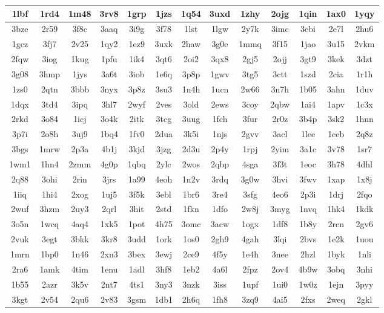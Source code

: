 \begin{tabular}{|c|c|c|c|c|c|c|c|c|c|c|c|c|}
\hline
1lbf & 1rd4 & 1m48 & 3rv8 & 1grp & 1jzs & 1q54 & 3uxd & 1zhy & 2ojg & 1qin & 1ax0 & 1yqy \\
\hline
3bze & 2r59 & 3f8c & 3aaq & 3i9g & 3f78 & 1lst & 1lgw & 2y7k & 3imc & 3ebi & 2e7l & 2hu6 \\
\hline
1gcz & 3fj7 & 2v25 & 1qy2 & 1ez9 & 3uxk & 2haw & 3g0e & 1mmq & 3f15 & 1jao & 3u15 & 2vkm \\
\hline
2fqw & 3iog & 1kug & 1pfu & 1ik4 & 3qt6 & 2oi2 & 3qx8 & 2gj5 & 2ojj & 3gt9 & 3kek & 3dzt \\
\hline
3g08 & 3hmp & 1jys & 3a6t & 3iob & 1e6q & 3p8p & 1gwv & 3tg5 & 3ctt & 1szd & 2cia & 1r1h \\
\hline
1zs0 & 2qtn & 3bbb & 3nyx & 3p8z & 3su3 & 1n4h & 1ucn & 2w66 & 3n7h & 1b05 & 3ahn & 1duv \\
\hline
1dqx & 3td4 & 3ipq & 3hl7 & 2wyf & 2ves & 3old & 2ews & 3coy & 2qbw & 1ai4 & 1apv & 1c3x \\
\hline
2rkd & 3o84 & 1icj & 3o4k & 2itk & 3tcg & 3uug & 1fch & 3fur & 2r0z & 3b4p & 3sk2 & 1hnn \\
\hline
3p7i & 2o8h & 3uj9 & 1bq4 & 1fv0 & 2dua & 3k5i & 1njs & 2gvv & 3acl & 1lee & 1ceb & 2q8z \\
\hline
3bgs & 1mrw & 2p3a & 4b1j & 3kjd & 3jzg & 2d3u & 2p4y & 1rpj & 2yim & 3a1c & 3v78 & 1sr7 \\
\hline
1wm1 & 1hn4 & 2zmm & 4g0p & 1qbq & 2ylc & 2wos & 2qbp & 4sga & 3f3t & 1eoc & 3h78 & 4dhl \\
\hline
2q88 & 3ohi & 2rin & 3jrs & 1a99 & 4eoh & 1n2v & 3rdq & 3g0w & 3hvi & 3fwv & 1xap & 1x8j \\
\hline
1iiq & 1hi4 & 2xog & 1uj5 & 3f5k & 3ebl & 1br6 & 3re4 & 3sfg & 4eo6 & 2p3i & 1drj & 2fqo \\
\hline
2wuf & 3hzm & 2uy3 & 2qrl & 3hit & 2std & 1fkn & 1dfo & 2w8j & 3myg & 1nvq & 1hk4 & 1kdk \\
\hline
3o5n & 1wcq & 4aq4 & 1xk5 & 1pot & 4h75 & 3omc & 3acw & 1ogx & 1df8 & 1b8y & 2rcn & 2gv6 \\
\hline
2vuk & 3egt & 3bkk & 3kr8 & 3udd & 1ork & 1os0 & 2gh9 & 4gah & 3lqi & 2bvs & 1e2k & 1uou \\
\hline
1mrn & 1bp0 & 1n46 & 2xn3 & 3bex & 3ewj & 2ce9 & 4f5y & 1e4h & 3nee & 2hzl & 1byk & 1nli \\
\hline
2ra6 & 1amk & 4tim & 1enu & 1adl & 3hf8 & 1eb2 & 4a6l & 2fpz & 2ov4 & 4b9w & 3obq & 3nhi \\
\hline
1b55 & 2azr & 3k5v & 2nt7 & 4ts1 & 3ny3 & 3nzk & 3iss & 1upf & 1ui0 & 1w0z & 1ejn & 3pyy \\
\hline
3kgt & 2v54 & 2qu6 & 2v83 & 3gsm & 1db1 & 2h6q & 1fh8 & 3zq9 & 4ai5 & 2fxs & 2weq & 2gkl \\
\hline
\end{tabular}